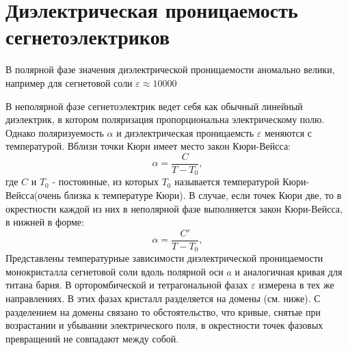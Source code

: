 \documentclass[12pt]{article}
\begin{document}
\section{Диэлектрическая проницаемость сегнетоэлектриков}
В полярной фазе значения диэлектрической проницаемости аномально велики, например для сегнетовой соли $\varepsilon \approx 10000$

В неполярной фазе сегнетоэлектрик ведет себя как обычный линейный диэлектрик, в котором поляризация пропорциональна электрическому полю. Однако поляризуемость $\alpha$ и диэлектрическая проницаемсть $\varepsilon$ меняются с температурой. Вблизи точки Кюри имеет место закон Кюри-Вейсса:
\[
\alpha = \frac{C}{T-T_0}, 
\]
где $C$ и $T_0$ - постоянные, из которых $T_0$ называется температурой Кюри-Вейсса(очень близка к температуре Кюри).
В случае, если точек Кюри две, то в окрестности каждой из них в неполярной фазе выполняется закон Кюри-Вейсса, в нижней в форме:
\[
    \alpha = \frac{C'}{T-T_0}, 
\]
Представлены температурные зависимости диэлектрической проницаемости монокристалла сегнетовой соли вдоль полярной оси $a$ и аналогичная кривая для титана бария. 
В орторомбической и тетрагональной фазах $\varepsilon$ измерена в тех же направлениях. В этих фазах кристалл разделяется на домены (см. ниже). С разделением на домены связано то обстоятельство, что кривые, снятые при возрастании и убывании электрического поля, в окрестности точек фазовых превращений не совпадают между собой.
\end{document}
